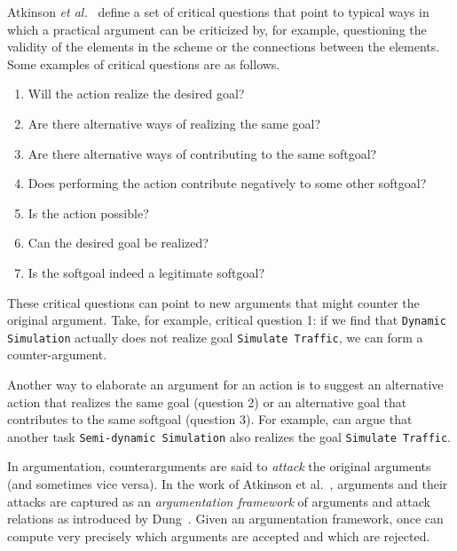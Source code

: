 Atkinson \emph{et al.}~\cite{atkinson2007} define a set of critical questions that point to typical ways in which a practical argument can be criticized by, for example, questioning the validity of the elements in the scheme or the connections between the elements. Some examples of critical questions are as follows.

\begin{enumerate}
\item Will the action realize the desired goal?
\item Are there alternative ways of realizing the same goal?
\item Are there alternative ways of contributing to the same softgoal?
\item Does performing the action contribute negatively to some other softgoal?
\item Is the action possible?
\item Can the desired goal be realized?
\item Is the softgoal indeed a legitimate softgoal?
\end{enumerate}

These critical questions can point to new arguments that might counter the original argument. Take, for example, critical question 1: if we find that  \texttt{Dynamic Simulation} actually does not realize goal \texttt{Simulate Traffic}, we can form a counter-argument.  

Another way to elaborate an argument for an action is to suggest an alternative action that realizes the same goal (question 2) or an alternative goal that contributes to the same softgoal (question 3). For example,  can argue that another task \texttt{Semi-dynamic Simulation} also realizes the goal \texttt{Simulate Traffic}.

In argumentation, counterarguments are said to \emph{attack} the original arguments (and sometimes vice versa). In the work of Atkinson et al.~\cite{atkinson2007}, arguments and their attacks are captured as an \emph{argumentation framework} of arguments and attack relations as introduced by Dung~\cite{Dung1995}. Given an argumentation framework, once can compute very precisely which arguments are accepted and which are rejected. 

